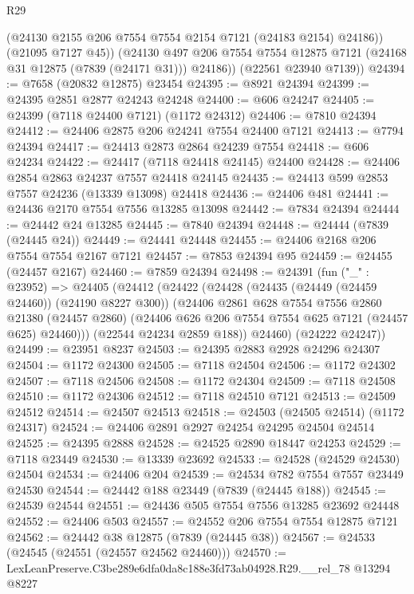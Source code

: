 \begin{lexlean}{R29}
\begin{coremodule}
            (@24130 @2155 @206 @7554 @7554 @2154 @7121 (@24183 @2154) @24186))
          (@21095 @7127 @45))
        (@24130 @497 @206 @7554 @7554 @12875 @7121 (@24168 @31 @12875 (@7839 (@24171 @31))) @24186))
      (@22561 @23940 @7139))
@24394 := @7658 (@20832 @12875) @23454
@24395 := @8921 @24394
@24399 := @24395 @2851 @2877 @24243 @24248
@24400 := @606 @24247
@24405 := @24399 (@7118 @24400 @7121) (@1172 @24312)
@24406 := @7810 @24394
@24412 := @24406 @2875 @206 @24241 @7554 @24400 @7121
@24413 := @7794 @24394
@24417 := @24413 @2873 @2864 @24239 @7554
@24418 := @606 @24234
@24422 := @24417 (@7118 @24418 @24145) @24400
@24428 := @24406 @2854 @2863 @24237 @7557 @24418 @24145
@24435 := @24413 @599 @2853 @7557 @24236 (@13339 @13098) @24418
@24436 := @24406 @481
@24441 := @24436 @2170 @7554 @7556 @13285 @13098
@24442 := @7834 @24394
@24444 := @24442 @24 @13285
@24445 := @7840 @24394
@24448 := @24444 (@7839 (@24445 @24))
@24449 := @24441 @24448
@24455 := @24406 @2168 @206 @7554 @7554 @2167 @7121
@24457 := @7853 @24394 @95
@24459 := @24455 (@24457 @2167)
@24460 := @7859 @24394
@24498 := @24391
    (fun ("_" : @23952) =>
    @24405
      (@24412
        (@24422
          (@24428
            (@24435 (@24449 (@24459 @24460)) (@24190 @8227 @300))
            (@24406
              @2861
              @628
              @7554
              @7556
              @2860
              @21380
              (@24457 @2860)
              (@24406 @626 @206 @7554 @7554 @625 @7121 (@24457 @625) @24460)))
          (@22544 @24234 @2859 @188))
        @24460)
      (@24222 @24247))
@24499 := @23951 @8237
@24503 := @24395 @2883 @2928 @24296 @24307
@24504 := @1172 @24300
@24505 := @7118 @24504
@24506 := @1172 @24302
@24507 := @7118 @24506
@24508 := @1172 @24304
@24509 := @7118 @24508
@24510 := @1172 @24306
@24512 := @7118 @24510 @7121
@24513 := @24509 @24512
@24514 := @24507 @24513
@24518 := @24503 (@24505 @24514) (@1172 @24317)
@24524 := @24406 @2891 @2927 @24254 @24295 @24504 @24514
@24525 := @24395 @2888
@24528 := @24525 @2890 @18447 @24253
@24529 := @7118 @23449
@24530 := @13339 @23692
@24533 := @24528 (@24529 @24530) @24504
@24534 := @24406 @204
@24539 := @24534 @782 @7554 @7557 @23449 @24530
@24544 := @24442 @188 @23449 (@7839 (@24445 @188))
@24545 := @24539 @24544
@24551 := @24436 @505 @7554 @7556 @13285 @23692 @24448
@24552 := @24406 @503
@24557 := @24552 @206 @7554 @7554 @12875 @7121
@24562 := @24442 @38 @12875 (@7839 (@24445 @38))
@24567 := @24533 (@24545 (@24551 (@24557 @24562 @24460)))
@24570 := LexLeanPreserve.C3be289e6dfa0da8c188e3fd73ab04928.R29.__rel_78 @13294 @8227

\end{coremodule}
\end{lexlean}

